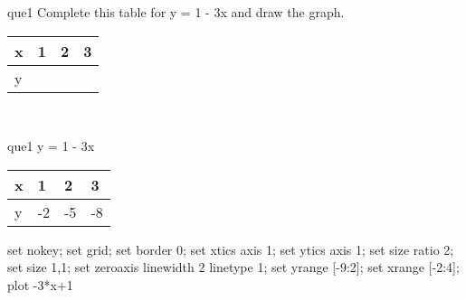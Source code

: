 \documentclass[13.5pt, varwidth=true]{beamer}
\begin{document}
\begin{frame}[shrink=19,fragile]
	\begin{beamercolorbox}[rounded=true, left, shadow=true,wd=14.8cm]{que1}
		 Complete this table for y = 1 - 3x and draw the graph. \\[0.3cm] \renewcommand{\arraystretch}{1.2}\begin{tabular}{|C|C|C|C|} \hline x & 1 & 2 & 3 \\ \hline y & & & \\ \hline \end{tabular}\\[0.3cm]
	\end{beamercolorbox}
\end{frame}
\begin{frame}[shrink=19,fragile]
	\begin{beamercolorbox}[rounded=true, left, shadow=true,wd=14.8cm]{que1}
		y = 1 - 3x\renewcommand{\arraystretch}{1.2}\begin{tabular}{|C|C|C|C|} \hline x & 1 & 2 & 3 \\ \hline y & -2 & -5 & -8\\ \hline \end{tabular}\begin{gnuplot}[terminal=pdf] set nokey; set grid; set border 0; set xtics axis 1; set ytics axis 1; set size ratio 2; set size 1,1; set zeroaxis linewidth 2 linetype 1; set yrange [-9:2]; set xrange [-2:4]; plot -3*x+1 \end{gnuplot}
	\end{beamercolorbox}
\end{frame}
\end{document}
